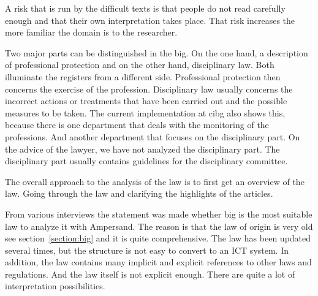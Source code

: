 A risk that is run by the difficult texts is that people do not read carefully enough and that their own interpretation takes place.
That risk increases the more familiar the domain is to the researcher.

Two major parts can be distinguished in the \acrshort{big}.
On the one hand, a description of professional protection and on the other hand, disciplinary law.
Both illuminate the registers from a different side.
Professional protection then concerns the exercise of the profession.
Disciplinary law usually concerns the incorrect actions or treatments that have been carried out and the possible measures to be taken.
The current implementation at \acrshort{cibg} also shows this, because there is one department that deals with the monitoring of the professions.
And another department that focuses on the disciplinary part.
On the advice of the lawyer, we have not analyzed the disciplinary part.
The disciplinary part usually contains guidelines for the disciplinary committee.

The overall approach to the analysis of the law is to first get an overview of the law.
Going through the law and clarifying the highlights of the articles.

From various interviews the statement was made whether \acrshort{big} is the most suitable law to analyze it with Ampersand.
The reason is that the law of origin is very old see section~\ref{section:big} and it is quite comprehensive.
The law has been updated several times, but the structure is not easy to convert to an ICT system.
In addition, the law contains many implicit and explicit references to other laws and regulations.
And the law itself is not explicit enough.
There are quite a lot of interpretation possibilities.